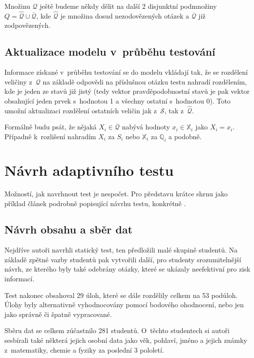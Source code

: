 \documentclass[a4paper,twoside,12pt]{scrbook}
\begin{document}
Množinu $\mathcal{Q}$ ještě budeme někdy dělit na další 2 disjunktní podmnožiny $Q = \widehat{\mathcal{Q}} \cup \overline{\mathcal{Q}}$, kde $\widehat{\mathcal{Q}}$ je množina dosud nezodovězených otázek a $\overline{\mathcal{Q}}$ již zodpovězených.

\subsection{Aktualizace modelu v~průběhu testování}
Informace získané v~průběhu testování se do modelu vkládají tak, že se rozdělení veličiny z~$\mathcal{Q}$ na základě odpovědi na příslušnou otázku testu nahradí rozdělením, kde je jeden ze stavů již jistý (tedy vektor pravděpodobnostní stavů je pak vektor obsahující jeden prvek s~hodnotou 1 a všechny ostatní s~hodnotou 0). Toto umožní aktualizaci rozdělení ostatních veličin jak z~$\mathcal{S}$, tak z~$\widehat{\mathcal{Q}}$.

Formálně budu psát, že nějaká $X_i \in \overline{\mathcal{Q}}$ nabývá hodnoty $x_i \in \mathbb{X}_i$ jako $X_i = x_i$. Případně k~rozlišení nahradím $X_i$ za $S_i$ nebo $\mathbb{X}_i$ za $\mathbb{Q}_i$ a podobně.


\section{Návrh adaptivního testu}
\label{sec:test_design}
Možností, jak navrhnout test je nespočet. Pro představu krátce shrnu jako příklad článek podrobně popisující návrhu testu, konkrétně \cite{vomlel_plajner2015}.

\subsection{Návrh obsahu a sběr dat}
Nejdříve autoři navrhli statický test, ten předložili malé skupině studentů. Na základě zpětné vazby studentů pak vytvořili další, pro studenty srozumitelnější návrh, ze kterého byly také odebrány otázky, které se ukázaly neefektivní pro zisk informací.

Test nakonec obsahoval 29 úloh, které se dále rozdělily celkem na 53 podúloh. Úlohy byly alternativně vyhodnocovány pomocí bodového ohodnocení, nebo jen jako správně či špatně vypracované.

Sběru dat se celkem zúčastnilo 281 studentů. O~těchto studentech si autoři sesbírali také některá jejich osobní data jako věk, pohlaví, jméno a jejich známky z~matematiky, chemie a fyziky za poslední 3 pololetí.
\end{document}
